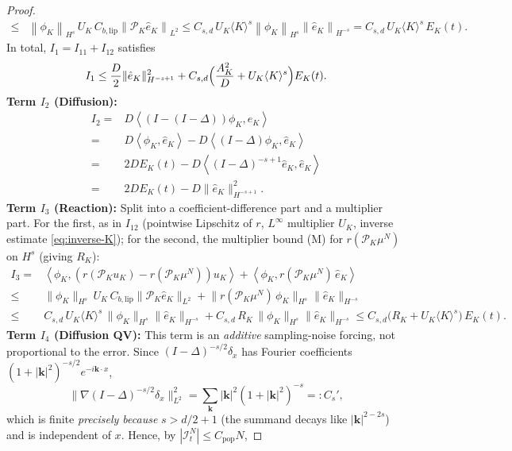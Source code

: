 \documentclass[a4paper,fleqn]{cas-sc}
\theoremstyle{definition}
\theoremstyle{remark}
\begin{document}
\begin{proof}
\[\begin{aligned}
     \leq&  \left\| \phi_K\right\|_{H^{s}} \,U_K\,C_{b,\mathrm{lip}}\left\|\mathcal P_K\hat{e}_K\right\|_{L^2}
     \leq C_{s,d}\,U_K\langle K\rangle^{s}\left\| \phi_K\right\|_{H^{s}} \left\|\hat{e}_K \right\|_{H^{-s}}
     = C_{s,d}\,U_K\langle K\rangle^{s}\, E_K(t).
\end{aligned}
\]
In total, $I_1=I_{11}+I_{12}$ satisfies
\[
I_1\leq \frac{D}{2}\|\hat e_K\|_{H^{-s+1}}^2
        +C_{s,d}\Bigl(\frac{A_K^2}{D}+U_K\langle K\rangle^{s}\Bigr)E_K(t).
\]
\textbf{Term $I_2$ (Diffusion): }
\[
\begin{aligned}
I_{2} = & D\left\langle (I-(I-\Delta))  \phi_K ,  \hat{e}_K \right\rangle\\
   =& D\left\langle  \phi_K ,  \hat{e}_K \right\rangle -  D\left\langle (I-\Delta)  \phi_K ,  \hat{e}_K \right\rangle\\
   = & 2D E_K(t) - D\left\langle (I-\Delta)^{-s+1}  \hat{e}_K ,  \hat{e}_K \right\rangle\\
   = & 2D E_K(t) - D\|\hat{e}_K\|_{H^{-s+1}}^2.
\end{aligned}
\]
\textbf{Term $I_3$ (Reaction):} Split into a coefficient-difference part and a
multiplier part. For the first, as in $I_{12}$ (pointwise Lipschitz of $r$, $L^\infty$
multiplier $U_K$, inverse estimate \eqref{eq:inverse-K}); for the second, the
multiplier bound (M) for $r(\mathcal P_K\mu^N)$ on $H^s$ (giving $R_K$):
\[
\begin{aligned}
I_3
=& \left\langle   \phi_K , \left(r\left(\mathcal P_K u_K\right)-r\left(\mathcal P_K \mu^N\right)\right)u_K\right\rangle
+ \left\langle   \phi_K , r(\mathcal P_K \mu^N)\,\hat e_K \right\rangle \\
\leq & \|\phi_K\|_{H^s}\,U_K\,C_{b,\mathrm{lip}}\|\mathcal P_K\hat e_K\|_{L^2}
+ \bigl\|r(\mathcal P_K\mu^N)\,\phi_K\bigr\|_{H^s}\|\hat e_K\|_{H^{-s}} \\
\leq & C_{s,d}\,U_K\langle K\rangle^{s}\,\|\phi_K\|_{H^s}\|\hat e_K\|_{H^{-s}}
+ C_{s,d}\,R_K\,\|\phi_K\|_{H^s}\|\hat e_K\|_{H^{-s}}
\le C_{s,d}\bigl(R_K+U_K\langle K\rangle^{s}\bigr)\, E_K(t).
\end{aligned}
\]
\textbf{Term $I_4$ (Diffusion QV):}
This term is an \emph{additive} sampling-noise forcing, not proportional to the
error. Since $(I-\Delta)^{-s/2}\delta_x$ has Fourier coefficients
$(1+|\mathbf k|^2)^{-s/2}e^{-i\mathbf k\cdot x}$,
\[
\bigl\|\nabla(I-\Delta)^{-s/2}\delta_x\bigr\|_{L^2}^2
=\sum_{\mathbf k}|\mathbf k|^2(1+|\mathbf k|^2)^{-s}=:C_s',
\]
which is finite \emph{precisely because} $s>d/2+1$ (the summand decays like
$|\mathbf k|^{2-2s}$) and is independent of $x$. Hence, by $|\mathcal I^N_t|\le C_{\mathrm{pop}}N$,

\end{proof}
\end{document}
